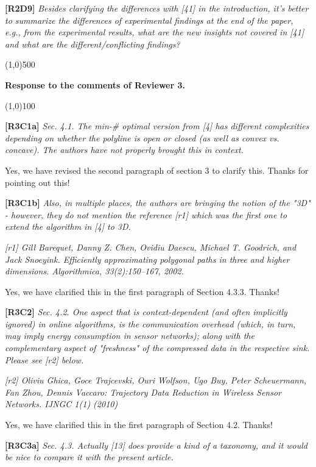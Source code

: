 \documentclass{letter}
\begin{document}
\textbf{[R2D9]} \emph{Besides clarifying the differences with [41] in the introduction, it’s better to summarize the differences of experimental findings at the end of the paper, e.g., from the experimental results, what are the new insights not covered in [41] and what are the different/conflicting findings?}




\line(1,0){500}

\textbf{Response to the comments of Reviewer 3.}

\line(1,0){100}

\textbf{[R3C1a]} \emph{
Sec. 4.1. The min-\# optimal version from [4] has different complexities depending on whether the polyline is open or closed (as well as convex vs. concave). The authors have not properly brought this in context.}

Yes, we have revised the second paragraph of section 3 to clarify this. Thanks for pointing out this!

\textbf{[R3C1b]} \emph{Also, in multiple places, the authors are bringing the notion of the "3D" - however, they do not mention the reference [r1] which was the first one to extend the algorithm in [4] to 3D. }

\emph{[r1] Gill Barequet, Danny Z. Chen, Ovidiu Daescu, Michael T. Goodrich, and Jack Snoeyink. Efficiently approximating polygonal paths in three and higher dimensions. Algorithmica, 33(2):150–167, 2002.}

Yes, we have clarified this in the first paragraph of Section 4.3.3. Thanks!

\textbf{[R3C2]} \emph{
Sec. 4.2. One aspect that is context-dependent (and often implicitly ignored) in online algorithms, is the communication overhead (which, in turn, may imply energy consumption in sensor networks); along with the complementary aspect of "freshness" of the compressed data in the respective sink. Please see [r2] below.}

\emph{[r2] Oliviu Ghica, Goce Trajcevski, Ouri Wolfson, Ugo Buy, Peter Scheuermann, Fan Zhou, Dennis Vaccaro: Trajectory Data Reduction in Wireless Sensor Networks. IJNGC 1(1) (2010)
}

Yes, we have clarified this in the first paragraph of Section 4.2. Thanks!

\textbf{[R3C3a]} \emph{
Sec. 4.3. Actually [13] does provide a kind of a taxonomy, and it would be nice to compare it with the present article. }
\end{document}
